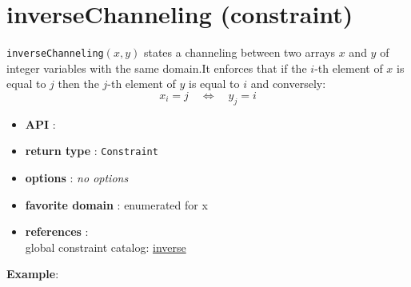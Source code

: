 \label{inversechanneling}
\hypertarget{inversechanneling}{}

\section{inverseChanneling (constraint)}\label{inversechanneling:inversechannelingconstraint}\hypertarget{inversechanneling:inversechannelingconstraint}{}
\begin{notedef}
  \texttt{inverseChanneling}$(x,y)$ states a channeling between two arrays  $x$ and $y$ of integer variables with the same domain.It enforces that if the $i$-th element of $x$ is equal to $j$ then the $j$-th element of $y$ is equal to $i$ and conversely:
$$x_i = j\quad\iff\quad y_j = i$$
\end{notedef}
\begin{itemize}
	\item \textbf{API} : 
	\item \textbf{return type} : \texttt{Constraint}
	\item \textbf{options} : \emph{no options}
	\item \textbf{favorite domain} : enumerated for x
	\item \textbf{references} :\\
      global constraint catalog: \href{http://www.emn.fr/x-info/sdemasse/gccat/Cinverse.html}{inverse}
\end{itemize}

\textbf{Example}:

